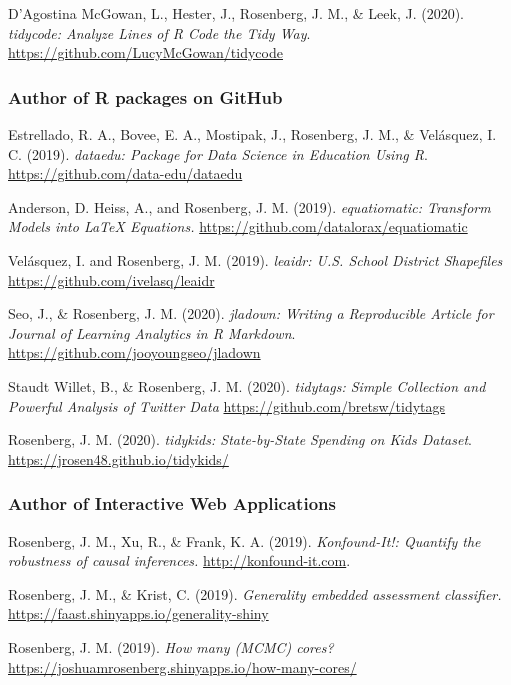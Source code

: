 \documentclass[
  14,
]{article}
\begin{document}
D'Agostina McGowan, L., Hester, J., Rosenberg, J. M., \& Leek, J.
(2020). \emph{tidycode: Analyze Lines of R Code the Tidy Way}.
\url{https://github.com/LucyMcGowan/tidycode}

\hypertarget{author-of-r-packages-on-github}{%
\subsubsection{Author of R packages on
GitHub}\label{author-of-r-packages-on-github}}

Estrellado, R. A., Bovee, E. A., Mostipak, J., Rosenberg, J. M., \&
Velásquez, I. C. (2019). \emph{dataedu: Package for Data Science in
Education Using R}. \url{https://github.com/data-edu/dataedu}

Anderson, D. Heiss, A., and Rosenberg, J. M. (2019). \emph{equatiomatic:
Transform Models into LaTeX Equations.}
\url{https://github.com/datalorax/equatiomatic}

Velásquez, I. and Rosenberg, J. M. (2019). \emph{leaidr: U.S. School
District Shapefiles} \url{https://github.com/ivelasq/leaidr}

Seo, J., \& Rosenberg, J. M. (2020). \emph{jladown: Writing a
Reproducible Article for Journal of Learning Analytics in R Markdown}.
\url{https://github.com/jooyoungseo/jladown}

Staudt Willet, B., \& Rosenberg, J. M. (2020). \emph{tidytags: Simple
Collection and Powerful Analysis of Twitter Data}
\url{https://github.com/bretsw/tidytags}

Rosenberg, J. M. (2020). \emph{tidykids: State-by-State Spending on Kids
Dataset}. \url{https://jrosen48.github.io/tidykids/}

\hypertarget{author-of-interactive-web-applications}{%
\subsubsection{Author of Interactive Web
Applications}\label{author-of-interactive-web-applications}}

Rosenberg, J. M., Xu, R., \& Frank, K. A. (2019). \emph{Konfound-It!:
Quantify the robustness of causal inferences.}
\url{http://konfound-it.com}.

Rosenberg, J. M., \& Krist, C. (2019). \emph{Generality embedded
assessment classifier.}
\url{https://faast.shinyapps.io/generality-shiny}

Rosenberg, J. M. (2019). \emph{How many (MCMC) cores?}
\url{https://joshuamrosenberg.shinyapps.io/how-many-cores/}
\end{document}
